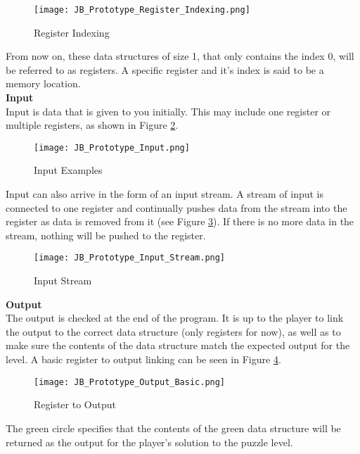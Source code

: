 \begin{figure}[!hb]
  \caption{Register Indexing}
  \label{fig:Register_Indexing}
  \centering
  \texttt{[image: JB\_Prototype\_Register\_Indexing.png]}
\end{figure}

From now on, these data structures of size 1, that only contains the index 0, will
be referred to as registers. A specific register and it's index is said to be a
memory location.\\

\textbf{Input}\\

Input is data that is given to you initially. This may include one register or
multiple registers, as shown in Figure \ref{fig:Input_Example}.

\begin{figure}[!hb]
  \caption{Input Examples}
  \label{fig:Input_Example}
  \centering
  \texttt{[image: JB\_Prototype\_Input.png]}
\end{figure}

Input can also arrive in the form of an input stream. A stream of input is connected
to one register and continually pushes data from the stream into the register as
data is removed from it (see Figure \ref{fig:Input_Stream}). If there is no more data in the stream,
nothing will be pushed to the register.

\begin{figure}[!hb]
  \caption{Input Stream}
  \label{fig:Input_Stream}
  \centering
  \texttt{[image: JB\_Prototype\_Input\_Stream.png]}
\end{figure}
\vfill
\clearpage

\textbf{Output}\\

The output is checked at the end of the program. It is up to the player to link
the output to the correct data structure (only registers for now), as well as to
make sure the contents of the data structure match the expected output for the level.
A basic register to output linking can be seen in Figure \ref{fig:Output_Basic}.

\begin{figure}[!hb]
  \caption{Register to Output}
  \label{fig:Output_Basic}
  \centering
  \texttt{[image: JB\_Prototype\_Output\_Basic.png]}
\end{figure}

The green circle specifies that the contents of the green data structure will be
returned as the output for the player's solution to the puzzle level.\\

